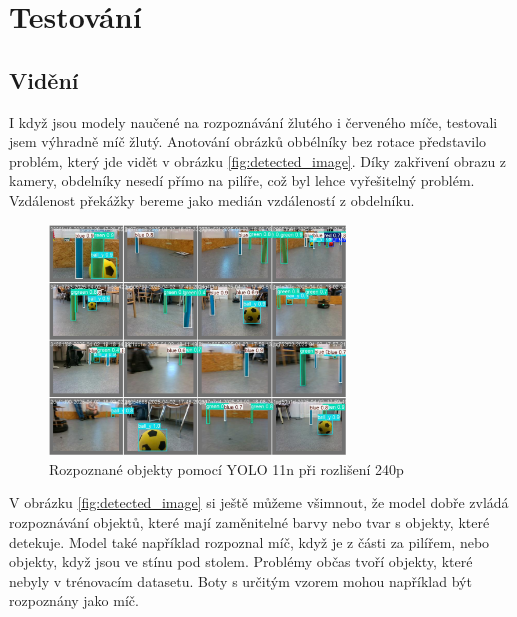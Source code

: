 \documentclass[a4paper,12pt]{article}
\begin{document}
\section{Testování}
\subsection{Vidění}
I když jsou modely naučené na rozpoznávání žlutého i červeného míče, testovali jsem výhradně míč žlutý. Anotování obrázků obbélníky bez rotace představilo problém, který jde vidět v obrázku \eqref{fig:detected_image}. Díky zakřivení obrazu z kamery, obdelníky nesedí přímo na pilíře, což byl lehce vyřešitelný problém. Vzdálenost překážky bereme jako medián vzdáleností z obdelníku.
\begin{figure}[H]
    \centering
    \includegraphics[width=0.7\textwidth]{pictures/rozpoznane.jpg}
    \caption{Rozpoznané objekty pomocí YOLO 11n při rozlišení 240p}
    \label{fig:detected_image}
\end{figure}

V obrázku \eqref{fig:detected_image} si ještě můžeme všimnout, že model dobře zvládá rozpoznávání objektů, které mají zaměnitelné barvy nebo tvar s objekty, které detekuje.
Model také například rozpoznal míč, když je z části za pilířem, nebo objekty, když jsou ve stínu pod stolem. Problémy občas tvoří objekty, které nebyly v trénovacím datasetu.
Boty s určitým vzorem mohou například být rozpoznány jako míč.
\end{document}
